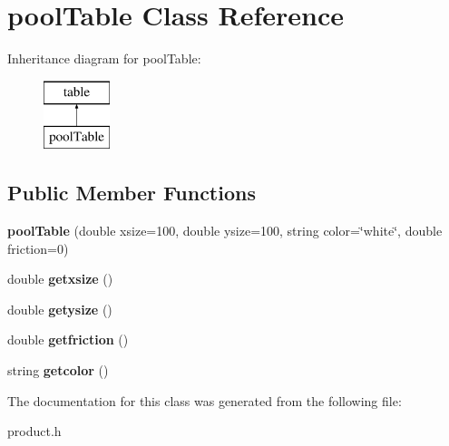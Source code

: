 \hypertarget{classpool_table}{}\section{pool\+Table Class Reference}
\label{classpool_table}
Inheritance diagram for pool\+Table\+:\begin{figure}[H]
\begin{center}
\leavevmode
\includegraphics[height=2.000000cm]{classpool_table}
\end{center}
\end{figure}
\subsection*{Public Member Functions}
\begin{DoxyCompactItemize}
\item 
\mbox{\label{classpool_table_a8e39cd90630d08a85d066ff01fab4a4e}} 
{\bfseries pool\+Table} (double xsize=100, double ysize=100, string color=\char`\"{}white\char`\"{}, double friction=0)
\item 
\mbox{\label{classpool_table_ae1daa626189b4eb4d0193cf34a06678f}} 
double {\bfseries getxsize} ()
\item 
\mbox{\label{classpool_table_a360aab2e21ebbf489c378e05a032ef5e}} 
double {\bfseries getysize} ()
\item 
\mbox{\label{classpool_table_ace06084f1066ca47a60915ae8589ae7e}} 
double {\bfseries getfriction} ()
\item 
\mbox{\label{classpool_table_a84be61ec08cc5688c25769fabd4c42c5}} 
string {\bfseries getcolor} ()
\end{DoxyCompactItemize}


The documentation for this class was generated from the following file\+:\begin{DoxyCompactItemize}
\item 
product.\+h\end{DoxyCompactItemize}
